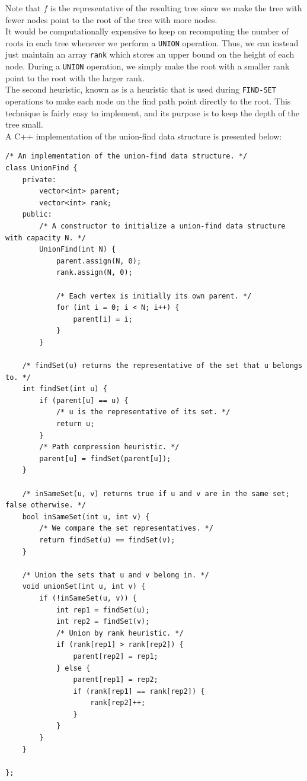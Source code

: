 Note that $f$ is the representative of the resulting tree since we make the tree with fewer nodes point to the root of the tree with more nodes. \\

It would be computationally expensive to keep on recomputing the number of roots in each tree whenever we perform a \verb!UNION! operation. Thus, we can instead just maintain an array \verb!rank! which stores an upper bound on the height of each node. During a \verb!UNION! operation, we simply make the root with a smaller rank point to the root with the larger rank. \\


The second heuristic, known as  is a heuristic that is used during \verb!FIND-SET! operations to make each node on the find path point directly to the root. This technique is fairly easy to implement, and its purpose is to keep the depth of the tree small. \\


A C++ implementation of the union-find data structure is presented below:


\begin{lstlisting}
/* An implementation of the union-find data structure. */
class UnionFind {
    private:
        vector<int> parent;
        vector<int> rank;
    public:
        /* A constructor to initialize a union-find data structure with capacity N. */
        UnionFind(int N) {
            parent.assign(N, 0);
            rank.assign(N, 0);
            
            /* Each vertex is initially its own parent. */
            for (int i = 0; i < N; i++) {
                parent[i] = i;
            }
        }
    
    /* findSet(u) returns the representative of the set that u belongs to. */    
    int findSet(int u) {
        if (parent[u] == u) {
            /* u is the representative of its set. */
            return u;
        }
        /* Path compression heuristic. */
        parent[u] = findSet(parent[u]);
    }
    
    /* inSameSet(u, v) returns true if u and v are in the same set; false otherwise. */
    bool inSameSet(int u, int v) {
        /* We compare the set representatives. */
        return findSet(u) == findSet(v);
    }
    
    /* Union the sets that u and v belong in. */
    void unionSet(int u, int v) {
        if (!inSameSet(u, v)) {
            int rep1 = findSet(u);
            int rep2 = findSet(v);
            /* Union by rank heuristic. */
            if (rank[rep1] > rank[rep2]) {
                parent[rep2] = rep1;    
            } else {
                parent[rep1] = rep2;
                if (rank[rep1] == rank[rep2]) {
                    rank[rep2]++;
                }
            }
        }
    }

};
\end{lstlisting}


